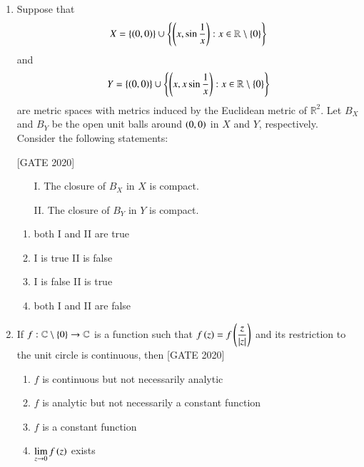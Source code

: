 \documentclass[journal,12pt,onecolumn]{IEEEtran}
\theoremstyle{remark}
\begin{document}
\begin{enumerate}
    \item  Suppose that
    \begin{align*}
    X = \left\{\left(0,0\right)\right\} \cup \left\{ \left( x, \sin \dfrac{1}{x} \right) : x \in \mathbb{R} \setminus \left\{0\right\} \right\}
    \end{align*}
    and
    \begin{align*}
    Y = \left\{\left(0,0\right)\right\} \cup \left\{ \left( x, x \sin \dfrac{1}{x} \right) : x \in \mathbb{R} \setminus \left\{0\right\} \right\}
    \end{align*}
    are metric spaces with metrics induced by the Euclidean metric of $\mathbb{R}^2$. Let $B_X$ and $B_Y$ be the open unit balls around $\left(0,0\right)$ in $X$ and $Y$, respectively. Consider the following statements:
    
    \hfill{[GATE 2020]}\begin{multicols}{2}\begin{enumerate}
        \item[I.] The closure of $B_X$ in $X$ is compact.
        \item[II.] The closure of $B_Y$ in $Y$ is compact.
    \end{enumerate}\end{multicols}
    \begin{multicols}{2}\begin{enumerate}
        \item both I and II are true
        \item I is true II is false 
         \item I is false II is true 
         \item both I and II are false
    \end{enumerate}\end{multicols}
    
\item If $f: \mathbb{C} \setminus \left\{0\right\} \to \mathbb{C}$ is a function such that $f\left(z\right) = f\left( \dfrac{z}{|z|}\right)$ and its restriction to the unit circle is continuous, then
    \hfill{[GATE 2020]}
       \begin{enumerate}
            \item $f$ is continuous but not necessarily analytic
            \item $f$ is analytic but not necessarily a constant function
            \item $f$ is a constant function
            \item $\lim\limits_{z \to 0} f\left(z\right)$ exists
        \end{enumerate}


\end{enumerate}
\end{document}
